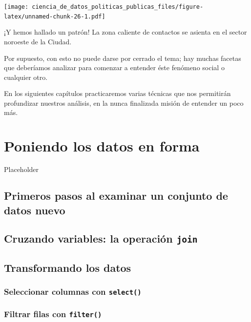 \documentclass[]{book}
\begin{document}
\texttt{[image: ciencia\_de\_datos\_politicas\_publicas\_files/figure-latex/unnamed-chunk-26-1.pdf]}

¡Y hemos hallado un patrón! La zona caliente de contactos se asienta en
el sector noroeste de la Ciudad.

Por supuesto, con esto no puede darse por cerrado el tema; hay muchas
facetas que deberíamos analizar para comenzar a entender éste fenómeno
social o cualquier otro.

En los siguientes capítulos practicaremos varias técnicas que nos
permitirán profundizar nuestros análisis, en la nunca finalizada misión
de entender un poco más.

\chapter{Poniendo los datos en forma}\label{poniendo-los-datos-en-forma}

Placeholder

\section{Primeros pasos al examinar un conjunto de datos
nuevo}\label{primeros-pasos-al-examinar-un-conjunto-de-datos-nuevo}

\section{\texorpdfstring{Cruzando variables: la operación
\texttt{join}}{Cruzando variables: la operación join}}\label{cruzando-variables-la-operacion-join}

\section{Transformando los datos}\label{transformando-los-datos}

\subsection{\texorpdfstring{Seleccionar columnas con
\texttt{select()}}{Seleccionar columnas con select()}}\label{seleccionar-columnas-con-select}

\subsection{\texorpdfstring{Filtrar filas con
\texttt{filter()}}{Filtrar filas con filter()}}\label{filtrar-filas-con-filter}
\end{document}
